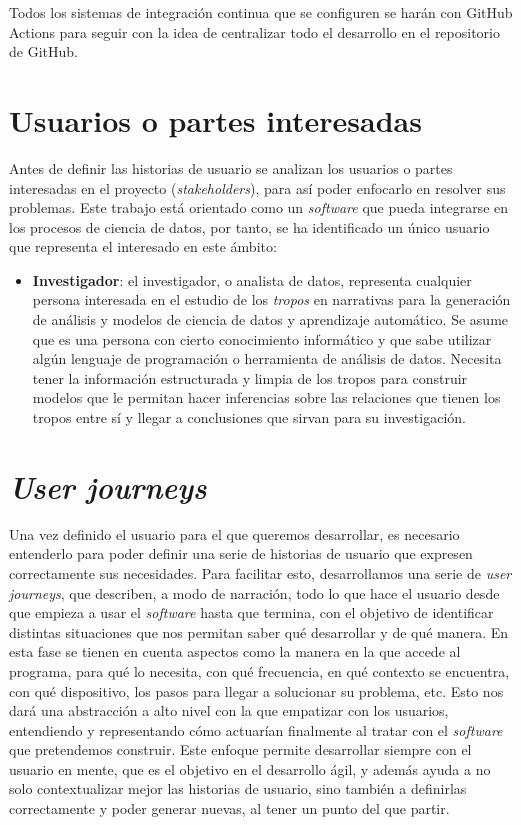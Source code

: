 Todos los sistemas de integración continua que se configuren se harán con GitHub
Actions para seguir con la idea de centralizar todo el desarrollo en el
repositorio de GitHub.

\section{Usuarios o partes interesadas}
Antes de definir las historias de usuario se analizan los usuarios o partes
interesadas en el proyecto (\textit{stakeholders}), para así poder enfocarlo en
resolver sus problemas. Este trabajo está orientado como un \textit{software}
que pueda integrarse en los procesos de ciencia de datos, por tanto, se ha
identificado un único usuario que representa el interesado en este ámbito:
\begin{itemize}
    \item \textbf{Investigador}: el investigador, o analista de datos,
    representa cualquier persona interesada en el estudio de los \textit{tropos}
    en narrativas para la generación de análisis y modelos de ciencia de datos y
    aprendizaje automático. Se asume que es una persona con cierto conocimiento
    informático y que sabe utilizar algún lenguaje de programación o herramienta
    de análisis de datos. Necesita tener la información estructurada y limpia de
    los tropos para construir modelos que le permitan hacer inferencias sobre
    las relaciones que tienen los tropos entre sí y llegar a conclusiones que
    sirvan para su investigación.
\end{itemize}

\section{\textit{User journeys}} 

Una vez definido el usuario para el que queremos desarrollar, es necesario
entenderlo para poder definir una serie de historias de usuario que expresen
correctamente sus necesidades. Para facilitar esto, desarrollamos una serie de
\textit{user journeys}, que describen, a modo de narración, todo lo que hace el
usuario desde que empieza a usar el \textit{software} hasta que termina, con el
objetivo de identificar distintas situaciones que nos permitan saber qué
desarrollar y de qué manera. En esta fase se tienen en cuenta aspectos como la
manera en la que accede al programa, para qué lo necesita, con qué frecuencia,
en qué contexto se encuentra, con qué dispositivo, los pasos para llegar a
solucionar su problema, etc. Esto nos dará una abstracción a alto nivel con la
que empatizar con los usuarios, entendiendo y representando cómo actuarían
finalmente al tratar con el \textit{software} que pretendemos construir. Este
enfoque permite desarrollar siempre con el usuario en mente, que es el objetivo
en el desarrollo ágil, y además ayuda a no solo contextualizar mejor las
historias de usuario, sino también a definirlas correctamente y poder generar
nuevas, al tener un punto del que partir.

